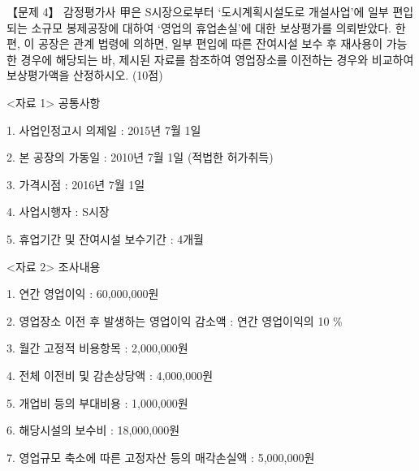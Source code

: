 \begin{longquestion}{【문제 4】}
감정평가사 甲은 S시장으로부터 ‘도시계획시설도로 개설사업’에 일부 편입되는 소규모 봉제공장에 대하여 ‘영업의 휴업손실’에 대한 보상평가를 의뢰받았다. 한편, 이 공장은 관계 법령에 의하면, 일부 편입에 따른 잔여시설 보수 후 재사용이 가능한 경우에 해당되는 바, 제시된 자료를 참조하여 영업장소를 이전하는 경우와 비교하여 보상평가액을 산정하시오. (10점) \par
<자료 1> 공통사항 \par
1. 사업인정고시 의제일 : 2015년 7월 1일 \par
2. 본 공장의 가동일 : 2010년 7월 1일 (적법한 허가취득) \par
3. 가격시점 : 2016년 7월 1일 \par
4. 사업시행자 : S시장 \par
5. 휴업기간 및 잔여시설 보수기간 : 4개월 \par
<자료 2> 조사내용 \par
1. 연간 영업이익 : 60,000,000원 \par
2. 영업장소 이전 후 발생하는 영업이익 감소액 : 연간 영업이익의 10 \% \par
3. 월간 고정적 비용항목 : 2,000,000원 \par
4. 전체 이전비 및 감손상당액 : 4,000,000원 \par
5. 개업비 등의 부대비용 : 1,000,000원 \par
6. 해당시설의 보수비 : 18,000,000원 \par
7. 영업규모 축소에 따른 고정자산 등의 매각손실액 : 5,000,000원 \par
\end{longquestion}
